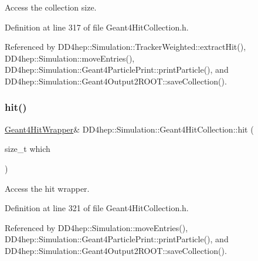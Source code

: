 Access the collection size. 



Definition at line 317 of file Geant4\+Hit\+Collection.\+h.



Referenced by D\+D4hep\+::\+Simulation\+::\+Tracker\+Weighted\+::extract\+Hit(), D\+D4hep\+::\+Simulation\+::move\+Entries(), D\+D4hep\+::\+Simulation\+::\+Geant4\+Particle\+Print\+::print\+Particle(), and D\+D4hep\+::\+Simulation\+::\+Geant4\+Output2\+R\+O\+O\+T\+::save\+Collection().

\hypertarget{class_d_d4hep_1_1_simulation_1_1_geant4_hit_collection_a6d42d1abdf6f052cc6606f0c55d55388}{}\label{class_d_d4hep_1_1_simulation_1_1_geant4_hit_collection_a6d42d1abdf6f052cc6606f0c55d55388} 
\subsubsection{\texorpdfstring{hit()}{hit()}\hspace{0.1cm}{\footnotesize\ttfamily [1/2]}}
{\footnotesize\ttfamily \hyperlink{class_d_d4hep_1_1_simulation_1_1_geant4_hit_wrapper}{Geant4\+Hit\+Wrapper}\& D\+D4hep\+::\+Simulation\+::\+Geant4\+Hit\+Collection\+::hit (\begin{DoxyParamCaption}\item[{size\+\_\+t}]{which }\end{DoxyParamCaption})\hspace{0.3cm}{\ttfamily [inline]}}



Access the hit wrapper. 



Definition at line 321 of file Geant4\+Hit\+Collection.\+h.



Referenced by D\+D4hep\+::\+Simulation\+::move\+Entries(), D\+D4hep\+::\+Simulation\+::\+Geant4\+Particle\+Print\+::print\+Particle(), and D\+D4hep\+::\+Simulation\+::\+Geant4\+Output2\+R\+O\+O\+T\+::save\+Collection().

\hypertarget{class_d_d4hep_1_1_simulation_1_1_geant4_hit_collection_adcca4533ecc91bd954bc2e4526d8fe77}{}\label{class_d_d4hep_1_1_simulation_1_1_geant4_hit_collection_adcca4533ecc91bd954bc2e4526d8fe77} 

